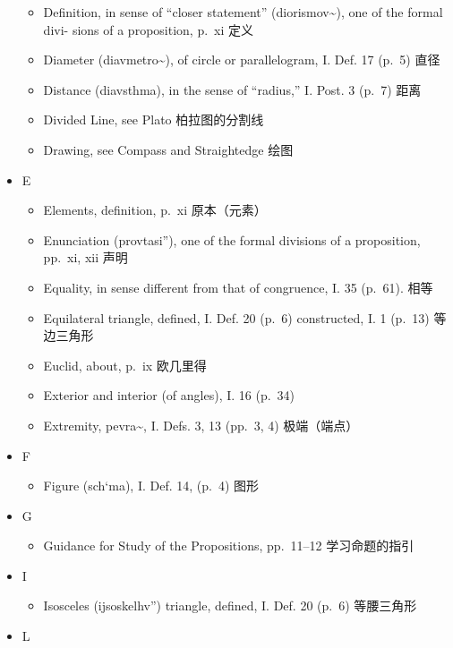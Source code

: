 \documentclass[
]{book}
\providecommand{\tightlist}{%
  \setlength{\itemsep}{0pt}\setlength{\parskip}{0pt}}
\begin{document}
\begin{itemize}
  \begin{itemize}
  \tightlist
  \item
    Definition, in sense of ``closer statement'' (diorismov\textasciitilde), one of the formal divi- sions of a proposition, p.~xi 定义
  \item
    Diameter (diavmetro\textasciitilde), of circle or parallelogram, I. Def. 17 (p.~5) 直径
  \item
    Distance (diavsthma), in the sense of ``radius,'' I. Post. 3 (p.~7) 距离
  \item
    Divided Line, see Plato 柏拉图的分割线
  \item
    Drawing, see Compass and Straightedge 绘图
  \end{itemize}
\item
  E

  \begin{itemize}
  \tightlist
  \item
    Elements, definition, p.~xi 原本（元素）
  \item
    Enunciation (provtasi''), one of the formal divisions of a proposition, pp.~xi, xii 声明
  \item
    Equality, in sense different from that of congruence, I. 35 (p.~61). 相等
  \item
    Equilateral triangle, defined, I. Def. 20 (p.~6) constructed, I. 1 (p.~13) 等边三角形
  \item
    Euclid, about, p.~ix 欧几里得
  \item
    Exterior and interior (of angles), I. 16 (p.~34)\\
  \item
    Extremity, pevra\textasciitilde, I. Defs. 3, 13 (pp.~3, 4) 极端（端点）
  \end{itemize}
\item
  F

  \begin{itemize}
  \tightlist
  \item
    Figure (sch`ma), I. Def. 14, (p.~4) 图形
  \end{itemize}
\item
  G

  \begin{itemize}
  \tightlist
  \item
    Guidance for Study of the Propositions, pp.~11--12 学习命题的指引
  \end{itemize}
\item
  I

  \begin{itemize}
  \tightlist
  \item
    Isosceles (ijsoskelhv'') triangle, defined, I. Def. 20 (p.~6) 等腰三角形
  \end{itemize}
\item
  L


\end{itemize}
\end{document}
